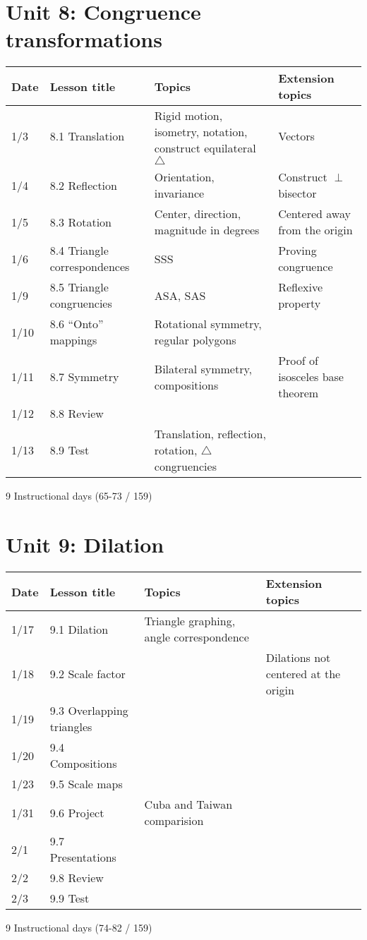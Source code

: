\section*{Unit 8: Congruence transformations}
\begin{tabular}{|p{0.9cm}|p{4cm}|p{7cm}|p{5cm}|}
  \hline
  Date & Lesson title & Topics  & Extension topics \\
  \hline
  1/3 & 8.1 Translation & Rigid motion, isometry, notation, construct equilateral $\triangle$ & Vectors \\
  \hline
  1/4 & 8.2 Reflection & Orientation, invariance & Construct $\perp$ bisector \\
  \hline
  1/5 & 8.3 Rotation & Center, direction, magnitude in degrees & Centered away from the origin \\
  \hline
  1/6 & 8.4 Triangle correspondences & SSS & Proving congruence \\
  \hline
  1/9 & 8.5 Triangle congruencies & ASA, SAS & Reflexive property \\
  \hline
  1/10 & 8.6 ``Onto'' mappings & Rotational symmetry, regular polygons & \\
  \hline
  1/11 & 8.7 Symmetry & Bilateral symmetry, compositions & Proof of isosceles base theorem \\
  \hline
  1/12 & 8.8 Review &  &  \\
  \hline
  1/13 & 8.9 Test & Translation, reflection, rotation, $\triangle$ congruencies &  \\
  \hline

\end{tabular} \par \vspace*{0.3cm}
9 Instructional days (65-73 / 159)

\newpage

\section*{Unit 9: Dilation}
\begin{tabular}{|p{0.9cm}|p{4cm}|p{7cm}|p{5cm}|}
  \hline
  Date & Lesson title & Topics  & Extension topics \\
  \hline
  1/17 & 9.1 Dilation & Triangle graphing, angle correspondence &  \\
  \hline
  1/18 & 9.2 Scale factor &  & Dilations not centered at the origin \\
  \hline
  1/19 & 9.3 Overlapping triangles &  &  \\
  \hline
  1/20 & 9.4 Compositions &  &  \\
  \hline
  1/23 & 9.5 Scale maps &  &  \\
  \hline
  1/31 & 9.6 Project & Cuba and Taiwan comparision & \\
  \hline
  2/1 & 9.7 Presentations &  &  \\
  \hline
  2/2 & 9.8 Review &  &  \\
  \hline
  2/3 & 9.9 Test &  &  \\
  \hline

\end{tabular} \par \vspace*{0.3cm}
9 Instructional days (74-82 / 159)



